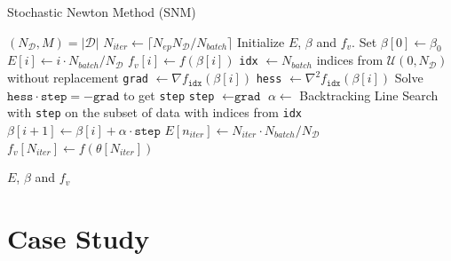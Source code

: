 \documentclass[conference]{IEEEtran}
\let\oldReturn\Return
\renewcommand{\Return}{\State\oldReturn}
\begin{document}
\begin{algorithm*}[t]
\caption{Stochastic Newton Method (SNM)}\label{algo:snm}
\begin{algorithmic}[1]
\State $(N_{\mathcal{D}}, M) = |\mathcal{D}|$ 
\State $N_{iter} \gets \lceil N_{ep}N_{\mathcal{D}}/N_{batch} \rceil$ 
\State Initialize $E$, $\beta$ and $f_v$. Set $\beta[0] \gets \beta_{0}$
\State $E[i] \gets i\cdot N_{batch}/N_{\mathcal{D}}$ 
\State $f_{v}[i] \gets f(\beta[i])$ 
\State \texttt{idx} $\gets N_{batch} $ indices from $\mathcal{U}(0, N_{\mathcal{D}})$ without replacement
\State \texttt{grad} $\gets \nabla f_{\texttt{idx}}(\beta[i])$ 
\State \texttt{hess} $\gets \nabla^2 f_{\texttt{idx}}(\beta[i])$ 
\State Solve $\texttt{hess} \cdot \texttt{step} = -\texttt{grad}$ to get \texttt{step} 
\Else 
\State \texttt{step} $\gets \texttt{grad}$ 
\EndIf
\State $\alpha \gets $ Backtracking Line Search with \texttt{step} on the subset of data  with indices from \texttt{idx}
\State $\beta[i+1] \gets \beta[i] + \alpha \cdot \texttt{step}$
\EndFor
\State $E[n_{iter}] \gets N_{iter}\cdot N_{batch} /N_{\mathcal{D}}$
\State $f_{v}[N_{iter}] \gets f(\theta[N_{iter}])$

\Return $E$, $\beta$ and $f_v$
\EndFunction
\end{algorithmic}
\end{algorithm*}

\section{Case Study}
\label{sec:model}
\end{document}
